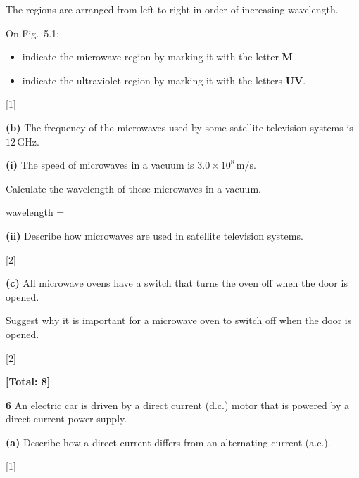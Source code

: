 \documentclass[12pt,a4paper]{article}
\newcommand{\qnum}[1]{\vspace{6pt}\noindent\textbf{#1}\hspace{0.5em}}
\newcommand{\totalmarks}[1]{\par\nopagebreak\hfill\textbf{[Total: #1]}\par}
\newcommand{\wline}{\par\vspace{1.5pt}\noindent\dotfill\par\vspace{1.5pt}}
\newcommand{\ansfield}[3]{%
  \par\vspace{6pt}
  \noindent #1 = \dotfill\ \mathrm{#2} \quad [#3]\par\vspace{4pt}
}
\begin{document}
The regions are arranged from left to right in order of increasing wavelength.

On Fig.~5.1:
\begin{itemize}[leftmargin=2.5em,itemsep=1pt]
  \item indicate the microwave region by marking it with the letter \textbf{M}
  \item indicate the ultraviolet region by marking it with the letters \textbf{UV}.
\end{itemize}
\hfill[1]

\textbf{(b)} The frequency of the microwaves used by some satellite television systems is $12\,\mathrm{GHz}$.

\hspace*{1.5em}\textbf{(i)} The speed of microwaves in a vacuum is $3.0 \times 10^{8}\,\mathrm{m/s}$.

Calculate the wavelength of these microwaves in a vacuum.

\vspace{2.5cm}
\ansfield{wavelength}{m}{3}

\hspace*{1.5em}\textbf{(ii)} Describe how microwaves are used in satellite television systems.

\wline \wline \wline
\hfill[2]

\newpage


\textbf{(c)} All microwave ovens have a switch that turns the oven off when the door is opened.

Suggest why it is important for a microwave oven to switch off when the door is opened.

\wline \wline \wline
\hfill[2]

\totalmarks{8}

\newpage


\qnum{6} An electric car is driven by a direct current (d.c.) motor that is powered by a direct current power supply.

\textbf{(a)} Describe how a direct current differs from an alternating current (a.c.).

\wline \wline
\hfill[1]
\end{document}
